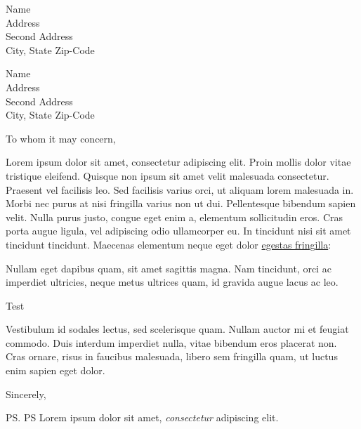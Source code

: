 \documentclass{letter}
\date{\today}
\renewenvironment{quote}{\vspace{6pt plus 2pt minus 1pt}\begin{customblockquote}\fontfamily{lmtt}\selectfont\list{}{\rightmargin=0.75em\leftmargin=0em}%
\item\relax\color{blockquote-text}\ignorespaces}{\unskip\unskip\endlist\end{customblockquote}}
\begin{document}
\begin{letter}{Name\\Address\\Second Address\\City, State Zip-Code}


\begin{flushright}
Name\\Address\\Second Address\\City, State Zip-Code
\end{flushright}

\opening{To whom it may concern,}

Lorem ipsum dolor sit amet, consectetur adipiscing elit. Proin mollis
dolor vitae tristique eleifend. Quisque non ipsum sit amet velit
malesuada consectetur. Praesent vel facilisis leo. Sed facilisis varius
orci, ut aliquam lorem malesuada in. Morbi nec purus at nisi fringilla
varius non ut dui. Pellentesque bibendum sapien velit. Nulla purus
justo, congue eget enim a, elementum sollicitudin eros. Cras porta augue
ligula, vel adipiscing odio ullamcorper eu. In tincidunt nisi sit amet
tincidunt tincidunt. Maecenas elementum neque eget dolor
\href{http://example.com}{egestas fringilla}:

\begin{quote}
Nullam eget dapibus quam, sit amet sagittis magna. Nam tincidunt, orci
ac imperdiet ultricies, neque metus ultrices quam, id gravida augue
lacus ac leo.

\begin{quote}
Test
\end{quote}
\end{quote}

Vestibulum id sodales lectus, sed scelerisque quam. Nullam auctor mi et
feugiat commodo. Duis interdum imperdiet nulla, vitae bibendum eros
placerat non. Cras ornare, risus in faucibus malesuada, libero sem
fringilla quam, ut luctus enim sapien eget dolor.

\closing{Sincerely,}

\vfill

\ps{PS Lorem ipsum dolor sit amet, \emph{consectetur} adipiscing elit.}

\end{letter}
\end{document}
